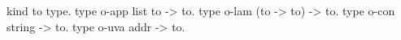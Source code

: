   kind to type.
  type o-app list to -> to.
  type o-lam (to -> to) -> to.
  type o-con string -> to.
  type o-uva addr -> to.
